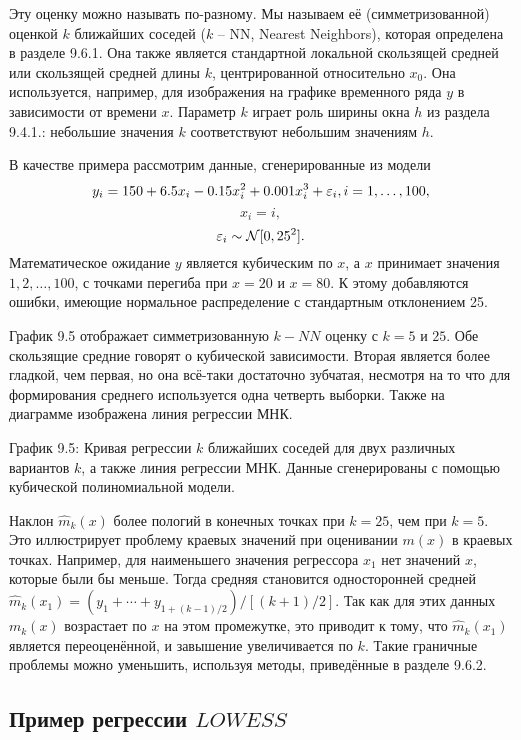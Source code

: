 Эту оценку можно называть по-разному. Мы называем её (симметризованной) оценкой $k$ ближайших соседей ($k$ -- NN, Nearest Neighbors), которая определена в разделе 9.6.1. Она также является стандартной локальной скользящей средней или скользящей средней длины $k$, центрированной относительно $x_0$. Она используется, например, для изображения на графике временного ряда $y$ в зависимости от времени $x$. Параметр $k$ играет роль ширины окна $h$ из раздела 9.4.1.: небольшие значения $k$ соответствуют небольшим значениям $h$.

В качестве примера рассмотрим данные, сгенерированные из модели
\begin{equation}
y_i = 150 + 6.5x_i - 0.15x_i^2 + 0.001x_i^3 + \varepsilon_i, i = 1, \dots, 100,
\end{equation}
\[
x_i = i,
\]
\[
\varepsilon_i \sim \mathcal{N}[0, 25^2].
\]
Математическое ожидание $y$ является кубическим по $x$, а $x$ принимает значения $1,2,\dots,100$, с точками перегиба при $x = 20$ и $x = 80$. К этому добавляются ошибки, имеющие нормальное распределение с стандартным отклонением 25.

График 9.5 отображает симметризованную $k - NN$ оценку с $k = 5$ и $25$. Обе скользящие средние говорят о кубической зависимости. Вторая является более гладкой, чем первая, но она всё-таки достаточно зубчатая, несмотря на то что для формирования среднего используется одна четверть выборки. Также на диаграмме изображена линия регрессии МНК.

\vspace{5cm}

График 9.5: Кривая регрессии $k$ ближайших соседей для двух различных вариантов $k$, а также линия регрессии МНК. Данные сгенерированы с помощью кубической полиномиальной модели.

Наклон $\hat{m}_k(x)$ более пологий в конечных точках при $k = 25$, чем при $k = 5$. Это иллюстрирует проблему краевых значений при оценивании $m(x)$ в краевых точках. Например, для наименьшего значения регрессора $x_1$ нет значений $x$, которые были бы меньше. Тогда средняя становится односторонней средней $\hat{m}_k(x_1) = (y_1 + \cdots + y_{1 + (k-1)/2})/[(k + 1)/2]$. Так как для этих данных $m_k(x)$ возрастает по $x$ на этом промежутке, это приводит к тому, что $\hat{m}_k(x_1)$ является переоценённой, и завышение увеличивается по $k$. Такие граничные проблемы можно уменьшить, используя методы, приведённые в разделе 9.6.2.

\subsection{Пример регрессии $LOWESS$}

